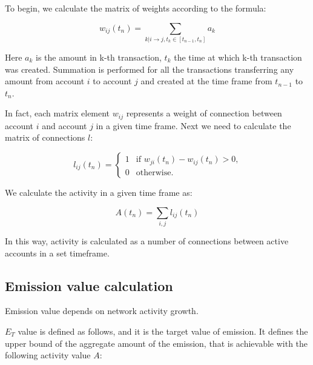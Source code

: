 \documentclass[a4paper,12pt]{article}
\begin{document}
To begin, we calculate the matrix of weights according to the formula:


$$
w_{ij}(t_n)=\sum_{k|i \to j, t_k \in [t_{n-1}, t_n]}a_k
$$

Here $a_k$  is the amount in k-th transaction, $t_k$  the time at which k-th transaction was created. Summation is performed for all the transactions transferring any amount from account $i$ to account $j$ and created at the time frame from $t_{n-1}$ to $t_n$. 

In fact, each matrix element $w_{ij}$ represents a weight of connection between account $i$ and account $j$ in a given time frame. Next we need to calculate the matrix of connections $l$: 

% 
% 

$$
l_{ij}(t_n) = \begin{cases}
 1
 & \text{if $w_{ji}(t_n)-w_{ij}(t_n) > 0$,}\\
 0 & \text{otherwise.}
\end{cases}
$$

We calculate the activity in a given time frame as:


$$
A(t_n) = \sum_{i,j} l_{ij}(t_n)
$$

In this way, activity is calculated as a number of connections between active accounts in a set timeframe. 


\subsection{Emission value calculation}

Emission value depends on network activity growth.

$E_T$ value is defined as follows, and it is the target value of emission. It defines the upper bound of the aggregate amount of the emission, that is achievable with the following activity value $A$:
\end{document}
